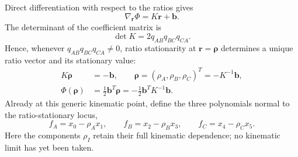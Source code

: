 \documentclass[a4paper,11pt]{article}
\begin{document}
Direct differentiation with respect to the ratios gives
\begin{equation}
 \nabla_{\boldsymbol r}\Phi=K\boldsymbol r+\boldsymbol b.
 \label{eq:five-ratio-gradient}
\end{equation}
The determinant of the coefficient matrix is
\begin{equation}
 \det K=2q_{AB}q_{BC}q_{CA}.
 \label{eq:five-ratio-determinant}
\end{equation}
Hence, whenever \(q_{AB}q_{BC}q_{CA}\ne0\), ratio stationarity at
\(\boldsymbol r=\boldsymbol\rho\) determines a unique ratio vector and its
stationary value:
\begin{equation}
 \begin{aligned}
 K\boldsymbol\rho&=-\boldsymbol b,\qquad
 \boldsymbol\rho=(\rho_A,\rho_B,\rho_C)^T=-K^{-1}\boldsymbol b,\\
 \Phi(\boldsymbol\rho)&=\frac12\boldsymbol b^T\boldsymbol\rho
 =-\frac12\boldsymbol b^TK^{-1}\boldsymbol b.
 \end{aligned}
 \label{eq:five-ratio-stationarity}
\end{equation}
Already at this generic kinematic point, define the three polynomials normal
to the ratio-stationary locus,
\begin{equation}
 f_A=x_0-\rho_Ax_1,\qquad f_B=x_2-\rho_Bx_3,
 \qquad f_C=x_4-\rho_Cx_5.
 \label{eq:five-path-normals}
\end{equation}
Here the components \(\rho_I\) retain their full kinematic dependence; no
kinematic limit has yet been taken.
\end{document}
